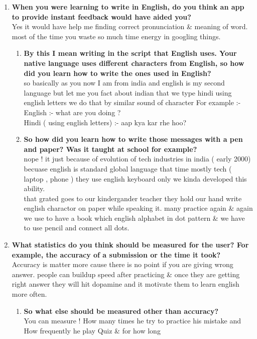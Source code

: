 \documentclass{article}
\begin{document}
\begin{enumerate}
    \item \textbf{When you were learning to write in English, do you think an app to provide instant feedback would have aided you?} \\ Yes it would have help me finding correct pronunciation \& meaning of word. most of the time you waste so much time energy in googling things.
    \begin{enumerate}
        \item \textbf{By this I mean writing in the script that English uses. Your native language uses different characters from English, so how did you learn how to write the ones used in English?} \\ so basically as you now I am from india and english is my second language but let me you fact about indian that we type hindi using english letters we do that by similar sound of character  For example :- \\ English :- what are you doing ? \\ Hindi ( using english letters) :- aap kya kar rhe hoo?
        \item \textbf{So how did you learn how to write those messages with a pen and paper? Was it taught at school for example?} \\ nope ! it just because of evolution of tech industries in india ( early 2000) becuase english is standard global language that time mostly tech ( laptop , phone ) they use english keyboard only we kinda developed  this ability. \\ that grated  goes to our kindergander teacher they hold our hand write english charactor on paper while speaking it. many practice again \& again we use to have a book which english alphabet in dot pattern \& we have to use pencil and connect all dots.
    \end{enumerate}
    \item \textbf{What statistics do you think should be measured for the user? For example, the accuracy of a submission or the time it took?} \\ Accuracy is matter more cause there is no point if you are giving wrong answer. people can buildup speed after practicing \& once they are getting right answer they will hit dopamine and it motivate them to learn english more often.
    \begin{enumerate}
        \item \textbf{So what else should be measured other than accuracy?} \\ You can measure ! How many times he try to practice his mistake and How frequently he play Quiz \& for how long

\end{enumerate}
\end{enumerate}
\end{document}
